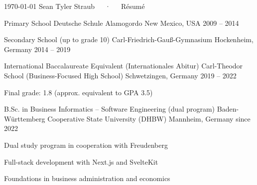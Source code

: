 \documentclass[11pt, a4paper]{awesome-cv}
\begin{document}
\makecvheader[C]

\makecvfooter
  {\today}
  {Sean Tyler Straub~~~·~~~Résumé}
  {\thepage}


\begin{cventries}

\cventry
  {Primary School}
  {Deutsche Schule Alamogordo}
  {New Mexico, USA}
  {2009 -- 2014}
  {}

\cventry
  {Secondary School (up to grade 10)}
  {Carl-Friedrich-Gauß-Gymnasium}
  {Hockenheim, Germany}
  {2014 -- 2019}
  {}

\cventry
  {International Baccalaureate Equivalent (Internationales Abitur)}
  {Carl-Theodor School (Business-Focused High School)}
  {Schwetzingen, Germany}
  {2019 -- 2022}
  {
    \begin{cvitems}
      \item {Final grade: 1.8 (approx. equivalent to GPA 3.5)}
    \end{cvitems}
  }

\cventry
  {B.Sc. in Business Informatics – Software Engineering (dual program)}
  {Baden-Württemberg Cooperative State University (DHBW)}
  {Mannheim, Germany}
  {since 2022}
  {
    \begin{cvitems}
      \item {Dual study program in cooperation with Freudenberg}
      \item {Full-stack development with Next.js and SvelteKit}
      \item {Foundations in business administration and economics}
    \end{cvitems}
  }

\end{cventries}

\end{document}
